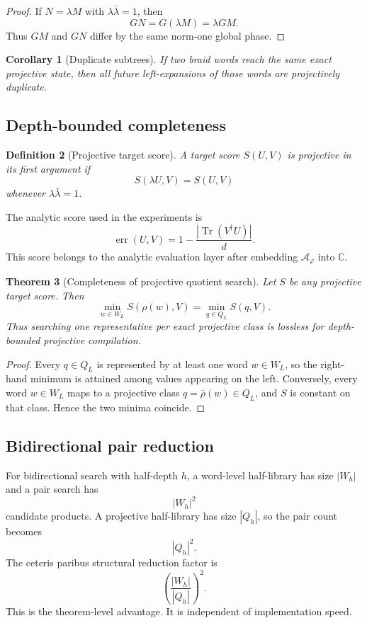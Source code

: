 \documentclass[11pt]{article}
\newtheorem{definition}{Definition}[section]
\newtheorem{theorem}[definition]{Theorem}
\newtheorem{corollary}[definition]{Corollary}
\newcommand{\ph}{\varphi}
\newcommand{\C}{\mathbb C}
\newcommand{\A}{\mathcal A}
\newcommand{\Tr}{\operatorname{Tr}}
\newcommand{\err}{\operatorname{err}}
\begin{document}
\begin{proof}
If $N=\lambda M$ with $\lambda\bar\lambda=1$, then
\[
    GN=G(\lambda M)=\lambda GM.
\]
Thus $GM$ and $GN$ differ by the same norm-one global phase.
\end{proof}

\begin{corollary}[Duplicate subtrees]
If two braid words reach the same exact projective state, then all future left-expansions of those words are projectively duplicate.
\end{corollary}

\subsection{Depth-bounded completeness}

\begin{definition}[Projective target score]
A target score $S(U,V)$ is projective in its first argument if
\[
    S(\lambda U,V)=S(U,V)
\]
whenever $\lambda\bar\lambda=1$.
\end{definition}

The analytic score used in the experiments is
\[
    \err(U,V)=1-\frac{|\Tr(V^\dagger U)|}{d}.
\]
This score belongs to the analytic evaluation layer after embedding $\A_\ph$ into $\C$.

\begin{theorem}[Completeness of projective quotient search]
Let $S$ be any projective target score.  Then
\[
    \min_{w\in W_L}S(\rho(w),V)
    =
    \min_{q\in Q_L}S(q,V).
\]
Thus searching one representative per exact projective class is lossless for depth-bounded projective compilation.
\end{theorem}

\begin{proof}
Every $q\in Q_L$ is represented by at least one word $w\in W_L$, so the right-hand minimum is attained among values appearing on the left.  Conversely, every word $w\in W_L$ maps to a projective class $q=\bar\rho(w)\in Q_L$, and $S$ is constant on that class.  Hence the two minima coincide.
\end{proof}

\subsection{Bidirectional pair reduction}

For bidirectional search with half-depth $h$, a word-level half-library has size $|W_h|$ and a pair search has
\[
    |W_h|^2
\]
candidate products.  A projective half-library has size $|Q_h|$, so the pair count becomes
\[
    |Q_h|^2.
\]
The ceteris paribus structural reduction factor is
\[
    \left(\frac{|W_h|}{|Q_h|}\right)^2.
\]
This is the theorem-level advantage.  It is independent of implementation speed.
\end{document}
